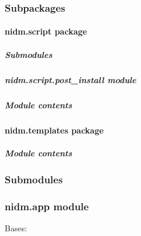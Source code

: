 \documentclass[letterpaper,10pt,english]{sphinxmanual}
\begin{document}
\subsubsection{Subpackages}
\label{nidm:subpackages}

\paragraph{nidm.script package}
\label{nidm.script::doc}\label{nidm.script:nidm-script-package}

\subparagraph{Submodules}
\label{nidm.script:submodules}

\subparagraph{nidm.script.post\_install module}
\label{nidm.script:module-nidm.script.post_install}\label{nidm.script:nidm-script-post-install-module}

\subparagraph{Module contents}
\label{nidm.script:module-contents}\label{nidm.script:module-nidm.script}

\paragraph{nidm.templates package}
\label{nidm.templates::doc}\label{nidm.templates:nidm-templates-package}

\subparagraph{Module contents}
\label{nidm.templates:module-contents}\label{nidm.templates:module-nidm.templates}

\subsubsection{Submodules}
\label{nidm:submodules}

\subsubsection{nidm.app module}
\label{nidm:module-nidm.app}\label{nidm:nidm-app-module}

\begin{fulllineitems}
\label{nidm:nidm.app.NIDMServer}
Bases: 

\end{fulllineitems}

\end{document}
